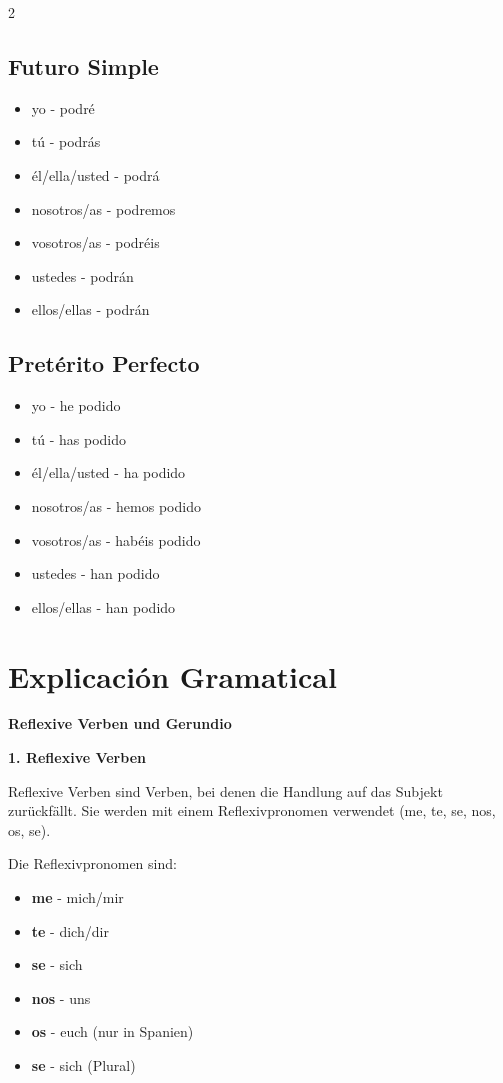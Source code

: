 \documentclass[12pt,a4paper]{article}
\begin{document}
\begin{multicols}{2}
\columnbreak

\subsection*{Futuro Simple}
\begin{itemize}[leftmargin=*]
    \item yo - podré
    \item tú - podrás
    \item él/ella/usted - podrá
    \item nosotros/as - podremos
    \item vosotros/as - podréis
    \item ustedes - podrán
    \item ellos/ellas - podrán
\end{itemize}

\subsection*{Pretérito Perfecto}
\begin{itemize}[leftmargin=*]
    \item yo - he podido
    \item tú - has podido
    \item él/ella/usted - ha podido
    \item nosotros/as - hemos podido
    \item vosotros/as - habéis podido
    \item ustedes - han podido
    \item ellos/ellas - han podido
\end{itemize}

\end{multicols}

\newpage

\section*{Explicación Gramatical}

\textbf{Reflexive Verben und Gerundio}

\textbf{1. Reflexive Verben}

Reflexive Verben sind Verben, bei denen die Handlung auf das Subjekt zurückfällt. Sie werden mit einem Reflexivpronomen verwendet (me, te, se, nos, os, se).

Die Reflexivpronomen sind:
\begin{itemize}[leftmargin=*]
    \item \textbf{me} - mich/mir
    \item \textbf{te} - dich/dir
    \item \textbf{se} - sich
    \item \textbf{nos} - uns
    \item \textbf{os} - euch (nur in Spanien)
    \item \textbf{se} - sich (Plural)
\end{itemize}
\end{document}
